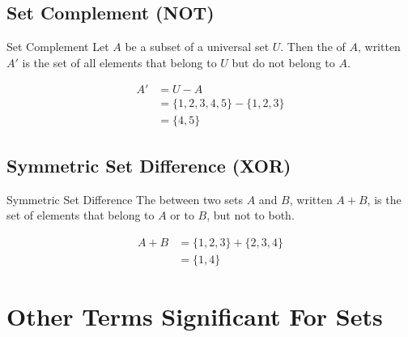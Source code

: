 \documentclass[../notes.tex]{subfiles}
\begin{document}
			\subsection[Set Complement]{Set Complement (NOT)}
				\begin{definition}{Set Complement}
					Let $A$ be a subset of a universal set $U$. Then the  of $A$, written $A'$ is the set of all elements that belong to $U$ but do not belong to $A$.
				\end{definition}
				\nopagebreak
				\begin{center}
					\begin{venntwo}[][$A' = \bigl\{x \mid x \notin A\bigr\}$]
						\fillNotA
					\end{venntwo}
				\end{center}
				\nopagebreak
				\begin{example} \moveup
					\begin{align*}
						A' &= U - A\\
						&= \{1, 2, 3, 4, 5\} - \{1, 2, 3\}\\
						&= \{4, 5\}
					\end{align*}
				\end{example}

			\pagebreak
			\subsection[Symmetric Set Difference]{Symmetric Set Difference (XOR)}
				\begin{definition}{Symmetric Set Difference}
					The  between two sets $A$ and $B$, written $A + B$, is the set of elements that belong to $A$ or to $B$, but not to both.
				\end{definition}
				\nopagebreak
				\begin{center}
					\begin{venntwo}[][$A + B = \bigl\{x \mid x \in A$ or $x \in B$, but not both$\bigr\}$]
						\fillOnlyA
						\fillOnlyB
					\end{venntwo}
				\end{center}
				\nopagebreak
				\begin{example} \moveup
					\begin{align*}
						A + B &= \{1, 2, 3\} + \{2, 3, 4\}\\
						&= \{1, 4\}
					\end{align*}
				\end{example}
		\section{Other Terms Significant For Sets}
\end{document}
